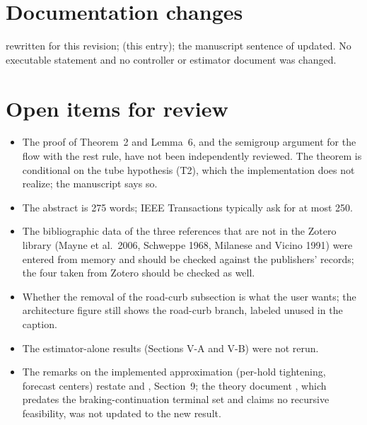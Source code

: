\documentclass[11pt]{article}
\begin{document}
\section{Documentation changes}
 rewritten for this revision; 
(this entry); the manuscript sentence of  updated. No
executable statement and no controller or estimator document was changed.

\section{Open items for review}
\begin{itemize}
\item The proof of Theorem~2 and Lemma~6, and the semigroup argument for the
  flow with the rest rule, have not been independently reviewed. The theorem
  is conditional on the tube hypothesis (T2), which the implementation does
  not realize; the manuscript says so.
\item The abstract is 275 words; IEEE Transactions typically ask for at most
  250.
\item The bibliographic data of the three references that are not in the
  Zotero library (Mayne et al.\ 2006, Schweppe 1968, Milanese and Vicino
  1991) were entered from memory and should be checked against the
  publishers' records; the four taken from Zotero should be checked as well.
\item Whether the removal of the road-curb subsection is what the user wants;
  the architecture figure still shows the road-curb branch, labeled unused in
  the caption.
\item The estimator-alone results (Sections V-A and V-B) were not rerun.
\item The remarks on the implemented approximation (per-hold tightening,
  forecast centers) restate  and
  , Section~9; the theory document
  , which predates the
  braking-continuation terminal set and claims no recursive feasibility, was
  not updated to the new result.
\end{itemize}
\end{document}
